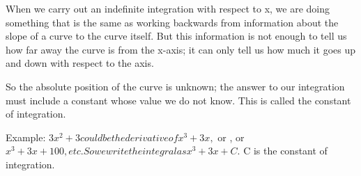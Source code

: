 When we carry out an indefinite integration with respect to x, we are doing something
that is the same as working backwards from information about the
slope of a curve to the curve itself. But this information is not enough
to tell us how far away the curve is from the x-axis; it can only tell us
how much it goes up and down with respect to the axis.
\par
So the absolute position of the curve is unknown; the answer
to our integration must include a constant whose value we do not know.
This is called the constant of integration.
\par
Example: $3x^{2}+3 could be the derivative of x^{3}+3x,$  or , or $x^{3}+3x+100, etc. So we write the integral as x^{3}+3x+C.$  C is
the constant of integration.